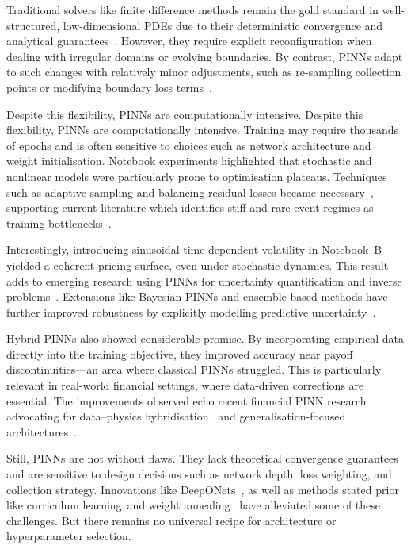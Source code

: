 \documentclass[12pt,a4paper]{article}
\begin{document}
Traditional solvers like finite difference methods remain the gold standard in well-structured, low-dimensional PDEs due to their deterministic convergence and analytical guarantees~\cite{leveque2007finite}. However, they require explicit reconfiguration when dealing with irregular domains or evolving boundaries. By contrast, PINNs adapt to such changes with relatively minor adjustments, such as re-sampling collection points or modifying boundary loss terms~\cite{karniadakis2021physics}.

Despite this flexibility, PINNs are computationally intensive. Despite this flexibility, PINNs are computationally intensive. Training may require thousands of epochs and is often sensitive to choices such as network architecture and weight initialisation. Notebook experiments highlighted that stochastic and nonlinear models were particularly prone to optimisation plateaus. Techniques such as adaptive sampling and balancing residual losses became necessary~\cite{shukla2022parallel}, supporting current literature which identifies stiff and rare-event regimes as training bottlenecks~\cite{wang2023rare}.

Interestingly, introducing sinusoidal time-dependent volatility in Notebook~B yielded a coherent pricing surface, even under stochastic dynamics. This result adds to emerging research using PINNs for uncertainty quantification and inverse problems~\cite{zang2020adaptive}. Extensions like Bayesian PINNs and ensemble-based methods have further improved robustness by explicitly modelling predictive uncertainty~\cite{yang2021bpn}.

Hybrid PINNs also showed considerable promise. By incorporating empirical data directly into the training objective, they improved accuracy near payoff discontinuities—an area where classical PINNs struggled. This is particularly relevant in real-world financial settings, where data-driven corrections are essential. The improvements observed echo recent financial PINN research advocating for data–physics hybridisation~\cite{wight2020solving} and generalisation-focused architectures~\cite{yang2023hybrid}.

Still, PINNs are not without flaws. They lack theoretical convergence guarantees and are sensitive to design decisions such as network depth, loss weighting, and collection strategy. Innovations like DeepONets~\cite{lu2021learning}, as well as methods stated prior like curriculum learning~\cite{goswami2022adaptive}and weight annealing~\cite{jagtap2020adaptive} have alleviated some of these challenges. But there remains no universal recipe for architecture or hyperparameter selection.
\end{document}
